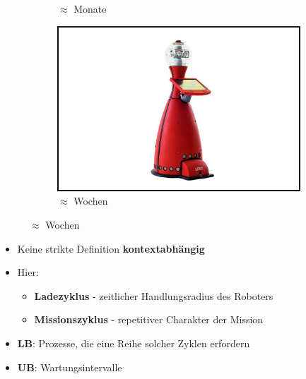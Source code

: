 \documentclass{beamer}
\begin{document}
\begin{frame}
\begin{figure}[H]
\begin{subfigure}[b]{0.32\textwidth}
      \caption*{$\approx$ Monate \cite{WaveGlider}}
    \end{subfigure}
    \begin{subfigure}[b]{0.32\textwidth}
      \centering
      \includegraphics[width=\textwidth]{img/service_robot.jpg}
      \caption*{$\approx$ Wochen \cite{ServiceRobot}}
    \end{subfigure}
  \end{figure}
  \begin{itemize}
    \item Keine strikte Definition \textrightarrow \thinspace \textbf{kontextabhängig}
    \item Hier:
    \begin{itemize}
      \item \textbf{Ladezyklus} - zeitlicher Handlungsradius des Roboters
      \item \textbf{Missionszyklus} - repetitiver Charakter der Mission
    \end{itemize}
    \item \textbf{LB}: Prozesse, die eine Reihe solcher Zyklen erfordern
    \item \textbf{UB}: Wartungsintervalle
  \end{itemize}
\end{frame}
\end{document}
